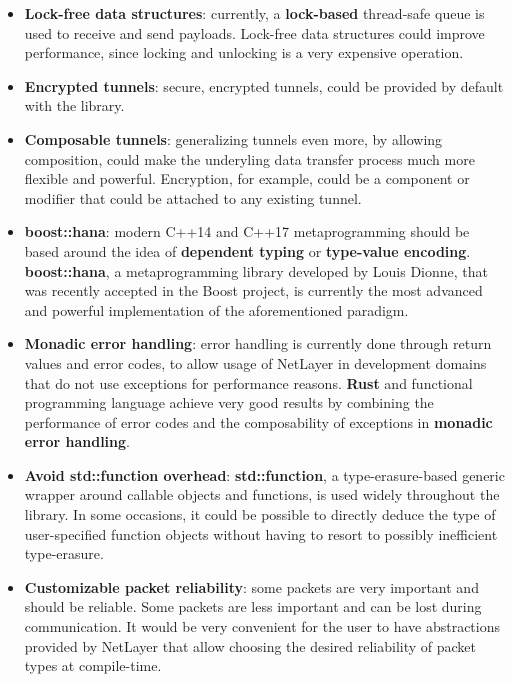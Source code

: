 \documentclass[11pt]{report}
\newcommand{\+}{\discretionary{\mbox{\scriptsize$\hookleftarrow$}}{}{}}
\renewcommand\emph{\textbf}
\begin{document}
\begin{itemize}
            \item \emph{Lock-free data structures}: currently, a \emph{lock-based} thread-safe queue is used to receive and send payloads. Lock-free data structures could improve performance, since locking and unlocking is a very expensive operation.

            \item \emph{Encrypted tunnels}: secure, encrypted tunnels, could be provided by default with the library. 

            \item \emph{Composable tunnels}: generalizing tunnels even more, by allowing composition, could make the underyling data transfer process much more flexible and powerful. Encryption, for example, could be a component or modifier that could be attached to any existing tunnel.

            \item \emph{boost::hana}: modern C++14 and C++17 metaprogramming should be based around the idea of \emph{dependent typing} or \emph{type-value encoding}. \emph{boost::hana}, a metaprogramming library developed by Louis Dionne, that was recently accepted in the Boost project, is currently the most advanced and powerful implementation of the aforementioned paradigm.

            \item \emph{Monadic error handling}: error handling is currently done through return values and error codes, to allow usage of NetLayer in development domains that do not use exceptions for performance reasons. \emph{Rust} and functional programming language achieve very good results by combining the performance of error codes and the composability of exceptions in \emph{monadic error handling}. 

            \item \emph{Avoid std::function overhead}: \emph{std::function}, a type-erasure-based generic wrapper around callable objects and functions, is used widely throughout the library. In some occasions, it could be possible to directly deduce the type of user-specified function objects without having to resort to possibly inefficient type-erasure.

            \item \emph{Customizable packet reliability}: some packets are very important and should be reliable. Some packets are less important and can be lost during communication. It would be very convenient for the user to have abstractions provided by NetLayer that allow choosing the desired reliability of packet types at compile-time.
        \end{itemize}
\end{document}
